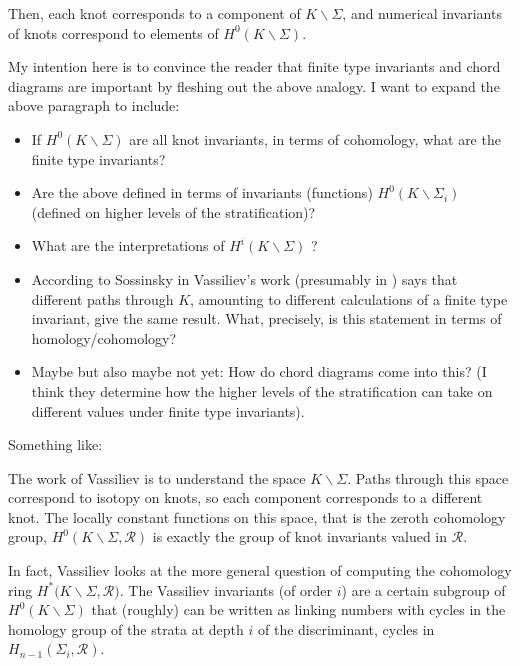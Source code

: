 \documentclass[12pt]{report}
\theoremstyle{regular}
\numberwithin{clause}{chapter}
\newcommand{\draftnote}[1]{
\begin{mdframed}[style=draftnote]
        {\color{Gray}{\scshape Note:} #1 }
\end{mdframed}
}
\begin{document}
        Then, each knot corresponds to a component of \(K \smallsetminus \Sigma\), and numerical invariants of knots correspond to elements of \(H^{0}(K \smallsetminus \Sigma)\).
        \draftnote{
                My intention here is to convince the reader that finite type invariants and chord diagrams are important by fleshing out the above analogy. I want to expand the above paragraph to include:
                \begin{itemize}
                        \item If \(H^{0}(K \smallsetminus \Sigma)\) are all knot invariants, in terms of cohomology, what are the finite type invariants?
                        \item Are the above defined in terms of invariants (functions) \(H^{0}(K \smallsetminus \Sigma_{i})\) (defined on higher levels of the stratification)?
                        \item What are the interpretations of \(H^{i}(K \smallsetminus \Sigma)\) \cite[p.149]{complements-of-discriminants-of-smooth-maps-topology-and-applications}?
                        \item According to Sossinsky in \cite[p. 49]{knots-mathematics-with-a-twist} Vassiliev's work (presumably in \cite{complements-of-discriminants-of-smooth-maps-topology-and-applications, cohomology-of-knot-spaces}) says that different paths through \(K\), amounting to different calculations of a finite type invariant, give the same result. What, precisely, is this statement in terms of homology/cohomology?
                        \item Maybe but also maybe not yet: How do chord diagrams come into this? (I think they determine how the higher levels of the stratification can take on different values under finite type invariants).
                \end{itemize}

                Something like:
        }

        The work of Vassiliev is to understand the space
        \(K \smallsetminus \Sigma\).
        Paths through this space correspond to isotopy on knots, so each component corresponds to a different knot. The locally constant functions on this space, that is the zeroth cohomology group,
        \({H^{0}(K \smallsetminus \Sigma, \mathcal{R})}\)
        is exactly the group of knot invariants valued in
        \(\mathcal{R}\).

        In fact, Vassiliev looks at the more general question of computing the cohomology ring
        \({H^{\ast}(K \smallsetminus \Sigma, \mathcal{R}})\).
        The Vassiliev invariants (of order \(i\)) are a certain subgroup of
        \({H^{0}(K \smallsetminus \Sigma)}\)
        that (roughly) can be written as linking numbers with cycles in the homology group of the strata at depth \(i\) of the discriminant, cycles in
        \({H_{n - 1}(\Sigma_{i}, \mathcal{R})}\).
\end{document}
